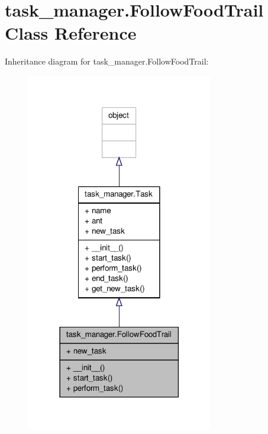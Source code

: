 \hypertarget{classtask__manager_1_1FollowFoodTrail}{\section{task\+\_\+manager.\+Follow\+Food\+Trail Class Reference}
\label{classtask__manager_1_1FollowFoodTrail}
}


Inheritance diagram for task\+\_\+manager.\+Follow\+Food\+Trail\+:\nopagebreak
\begin{figure}[H]
\begin{center}
\leavevmode
\includegraphics[width=230pt]{classtask__manager_1_1FollowFoodTrail__inherit__graph}
\end{center}
\end{figure}


